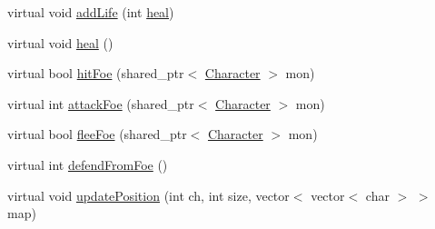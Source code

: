 \begin{DoxyCompactItemize}
virtual void \hyperlink{class_character_ae918c7b3a969a663ac236d8be2dd2cbe}{add\-Life} (int \hyperlink{class_character_a3871907535bb9cf3a042822e2dd1ec5c}{heal})
\item 
virtual void \hyperlink{class_character_a3871907535bb9cf3a042822e2dd1ec5c}{heal} ()
\item 
virtual bool \hyperlink{class_character_a684f4e8ca9d0d3584b68a1b0f58ba6df}{hit\-Foe} (shared\-\_\-ptr$<$ \hyperlink{class_character}{Character} $>$ mon)
\item 
virtual int \hyperlink{class_character_a806a54c9d1cd1493187731805e7f0498}{attack\-Foe} (shared\-\_\-ptr$<$ \hyperlink{class_character}{Character} $>$ mon)
\item 
virtual bool \hyperlink{class_character_a153234821b45278ac2881b8bb232f526}{flee\-Foe} (shared\-\_\-ptr$<$ \hyperlink{class_character}{Character} $>$ mon)
\item 
virtual int \hyperlink{class_character_a3ab7441a4186ff819f5abd5d3c362d33}{defend\-From\-Foe} ()
\item 
virtual void \hyperlink{class_character_a6e56b870b7f9d4ea845cf644cf458cb4}{update\-Position} (int ch, int size, vector$<$ vector$<$ char $>$ $>$ map)
\end{DoxyCompactItemize}
